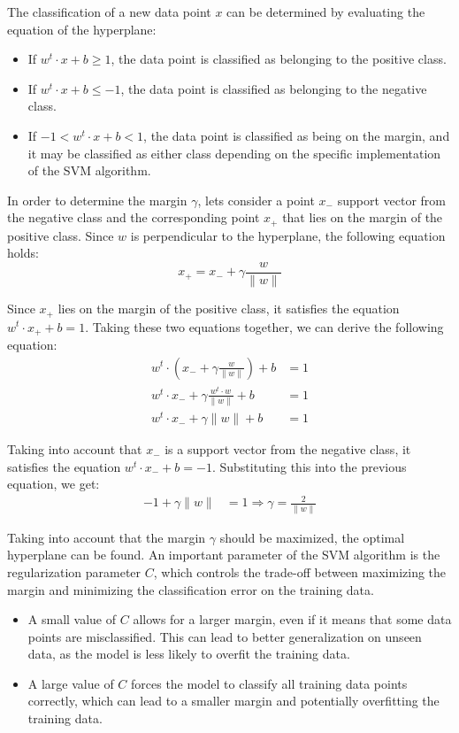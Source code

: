 The classification of a new data point $x$ can be determined by evaluating the equation of the hyperplane:
\begin{itemize}
    \item If $w^t \cdot x + b \geq 1$, the data point is classified as belonging to the positive class.
    \item If $w^t \cdot x + b \leq -1$, the data point is classified as belonging to the negative class.
    \item If $-1 < w^t \cdot x + b < 1$, the data point is classified as being on the margin, and it may be classified as either class depending on the specific implementation of the SVM algorithm.
\end{itemize}

In order to determine the margin $\gamma$, lets consider a point $x_{-}$ support vector from the negative class and the corresponding point $x_{+}$ that lies on the margin of the positive class. Since $w$ is perpendicular to the hyperplane, the following equation holds:
\begin{equation*}
    x_{+} = x_{-} + \gamma \frac{w}{\|w\|}
\end{equation*}

Since $x_{+}$ lies on the margin of the positive class, it satisfies the equation $w^t \cdot x_{+} + b = 1$. Taking these two equations together, we can derive the following equation:
\begin{align*}
    w^t \cdot \left(x_{-} + \gamma \frac{w}{\|w\|}\right) + b &= 1 \\
    w^t \cdot x_{-} + \gamma \frac{w^t \cdot w}{\|w\|} + b &= 1\\
    w^t \cdot x_{-} + \gamma \|w\| + b &= 1
\end{align*}

Taking into account that $x_{-}$ is a support vector from the negative class, it satisfies the equation $w^t \cdot x_{-} + b = -1$. Substituting this into the previous equation, we get:
\begin{align*}
    -1 + \gamma \|w\| &= 1 \Longrightarrow \gamma = \frac{2}{\|w\|}
\end{align*}

Taking into account that the margin $\gamma$ should be maximized, the optimal hyperplane can be found. An important parameter of the SVM algorithm is the regularization parameter $C$, which controls the trade-off between maximizing the margin and minimizing the classification error on the training data.
\begin{itemize}
    \item A small value of $C$ allows for a larger margin, even if it means that some data points are misclassified. This can lead to better generalization on unseen data, as the model is less likely to overfit the training data.
    \item A large value of $C$ forces the model to classify all training data points correctly, which can lead to a smaller margin and potentially overfitting the training data.
\end{itemize}

